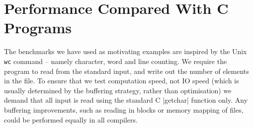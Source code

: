 \begin{comment}
\begin{code}
let f = inc
in f y : map f ys
\end{code}

If |f| is not inlined, then the recursive call to |map| would still contain a functional variable to be passed at runtime. But how can we tell whether |inc| is cheap enough to be inlined? The solution is to optimise |inc| first:

\begin{code}
let f = \x -> x + 1
in f y : map f ys
\end{code}

It is now clear that |f| is a lambda, so no shared computation is lost by inlining it.

\subsection{CAF's}
\label{sec:caf}

In this program |caf| would only be computed once. If a CAF is inlined then this may result in a computation being performed more than would otherwise occur. To ensure that we do not duplicate computations, we never inline CAF's.

\end{comment}

\section{Performance Compared With C Programs}
\label{sec:c_results}

\begin{comment}
The most comprehensive inter-language benchmarking effort is the Programming Language Shootout\footnote{\url{http://shootout.alioth.debian.org/}}. In the shootout a variety of tasks are implemented in many languages and benchmarked against each other. Unfortunately, in order to ensure a balanced comparison, many restrictions are placed upon the solutions -- some of which severely hamper lazy languages. Inspired by their attempt, we have defined some simpler benchmarks on which it is possible to directly compare Haskell to C.
\end{comment}

The benchmarks we have used as motivating examples are inspired by the Unix \texttt{wc} command -- namely character, word and line counting. We require the program to read from the standard input, and write out the number of elements in the file. To ensure that we test computation speed, not IO speed (which is usually determined by the buffering strategy, rather than optimisation) we demand that all input is read using the standard C |getchar| function only. Any buffering improvements, such as reading in blocks or memory mapping of files, could be performed equally in all compilers.

